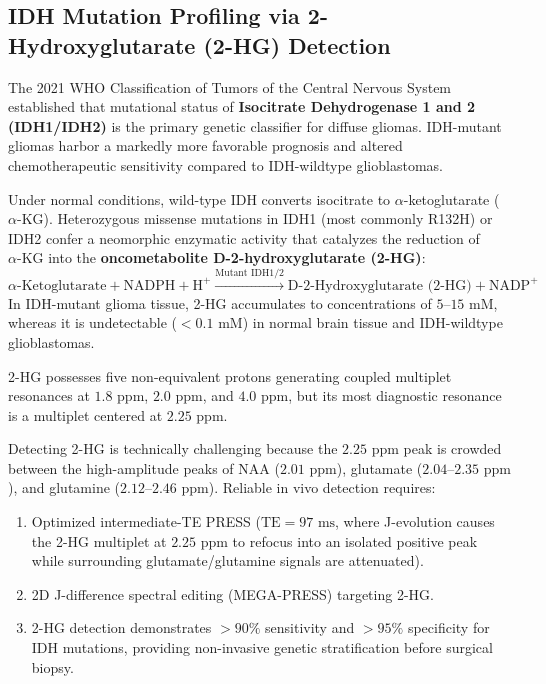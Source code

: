 \documentclass[11pt,a4paper]{article}
\begin{document}
\subsection{IDH Mutation Profiling via 2-Hydroxyglutarate (2-HG) Detection}
The 2021 WHO Classification of Tumors of the Central Nervous System established that mutational status of \textbf{Isocitrate Dehydrogenase 1 and 2 (IDH1/IDH2)} is the primary genetic classifier for diffuse gliomas. IDH-mutant gliomas harbor a markedly more favorable prognosis and altered chemotherapeutic sensitivity compared to IDH-wildtype glioblastomas.

Under normal conditions, wild-type IDH converts isocitrate to $\alpha$-ketoglutarate ($\alpha\text{-KG}$). Heterozygous missense mutations in IDH1 (most commonly R132H) or IDH2 confer a neomorphic enzymatic activity that catalyzes the reduction of $\alpha\text{-KG}$ into the \textbf{oncometabolite D-2-hydroxyglutarate (2-HG)}:
\begin{equation}
    \alpha\text{-Ketoglutarate} + \text{NADPH} + \text{H}^+ \xrightarrow{\text{Mutant IDH1/2}} \text{D-2-Hydroxyglutarate (2-HG)} + \text{NADP}^+
\end{equation}
In IDH-mutant glioma tissue, 2-HG accumulates to concentrations of $5\text{--}15\text{ mM}$, whereas it is undetectable ($< 0.1\text{ mM}$) in normal brain tissue and IDH-wildtype glioblastomas.

\begin{clinicalpearl}
2-HG possesses five non-equivalent protons generating coupled multiplet resonances at $1.8\text{ ppm}$, $2.0\text{ ppm}$, and $4.0\text{ ppm}$, but its most diagnostic resonance is a multiplet centered at \textbf{$2.25\text{ ppm}$}. 

Detecting 2-HG is technically challenging because the $2.25\text{ ppm}$ peak is crowded between the high-amplitude peaks of NAA ($2.01\text{ ppm}$), glutamate ($2.04\text{--}2.35\text{ ppm}$), and glutamine ($2.12\text{--}2.46\text{ ppm}$). Reliable in vivo detection requires:
\begin{enumerate}
    \item Optimized intermediate-TE PRESS ($\text{TE} = 97\text{ ms}$, where J-evolution causes the 2-HG multiplet at $2.25\text{ ppm}$ to refocus into an isolated positive peak while surrounding glutamate/glutamine signals are attenuated).
    \item 2D J-difference spectral editing (MEGA-PRESS) targeting 2-HG.
    \item 2-HG detection demonstrates $> 90\%$ sensitivity and $> 95\%$ specificity for IDH mutations, providing non-invasive genetic stratification before surgical biopsy.
\end{enumerate}
\end{clinicalpearl}
\end{document}
